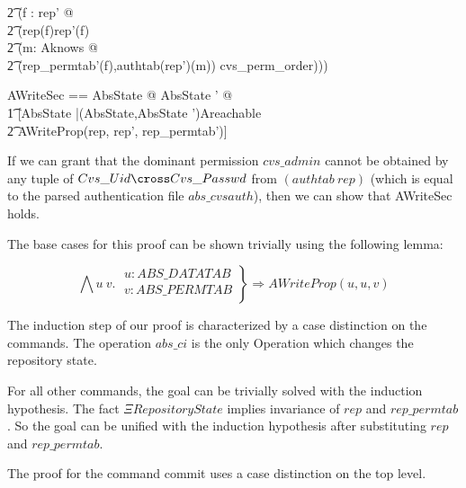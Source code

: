 \begin{enumerate}
\begin{doc}{3}
\begin{axdef}
    \t2 (\forall f : \dom rep' @\\
    \t2 (rep(f)\neq rep'(f)\\
    \t2 \implies (\exists m: Aknows @ \\
    \t2 (rep\_permtab'(f),authtab(rep')(m)) \in cvs\_perm\_order)))\\
  \end{axdef}
\end{doc}
  \begin{zed}
%
%
    AWriteSec == \forall AbsState @ \forall  AbsState ' @ \\
    \t1 [\Delta AbsState |(\theta AbsState,\theta AbsState ')\in Areachable \\
    \t2 \implies AWriteProp(rep, rep', rep\_permtab')]\\ 
  \end{zed}
%
  If we can grant that the dominant permission $cvs\_admin$ cannot be obtained
  by any tuple of $Cvs\_Uid \cross Cvs\_Passwd$ from $(authtab~rep)$ (which is
  equal to the parsed authentication file $abs\_cvsauth$), then we can show that
  AWriteSec holds.
%
 
  The base cases for this proof can be shown trivially using the following
  lemma:

%
  \[
  \bigwedge u~v.\;
%
%
  \left.
    \begin{array}{l}
      u : ABS\_DATATAB\\
      v : ABS\_PERMTAB\\
    \end{array}
  \right\}
%
%
  \Longrightarrow
  AWriteProp(u, u, v)
  \]
%

  The induction step of our proof is characterized by a case distinction on the
  commands. The operation $abs\_ci$ is the only Operation which changes the
  repository state.
%

    For all other commands, the goal can be trivially solved with the induction
    hypothesis. The fact $\Xi RepositoryState$ implies invariance of $rep$ and
    $rep\_permtab$. So the goal can be unified with the induction hypothesis
    after substituting $rep$ and $rep\_permtab$. 
%
    
    The proof for the command commit uses a case distinction on the top level.


\end{enumerate}
